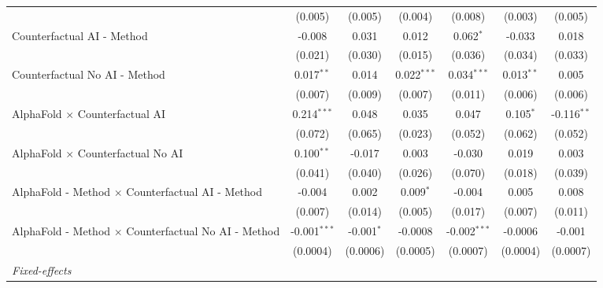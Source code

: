 \begin{tabular}{lcccccc}
                                                              & (0.005)        & (0.005)       & (0.004)       & (0.008)        & (0.003)       & (0.005)\\   
   Counterfactual AI - Method                                 & -0.008         & 0.031         & 0.012         & 0.062$^{*}$    & -0.033        & 0.018\\   
                                                              & (0.021)        & (0.030)       & (0.015)       & (0.036)        & (0.034)       & (0.033)\\   
   Counterfactual No AI - Method                              & 0.017$^{**}$   & 0.014         & 0.022$^{***}$ & 0.034$^{***}$  & 0.013$^{**}$  & 0.005\\   
                                                              & (0.007)        & (0.009)       & (0.007)       & (0.011)        & (0.006)       & (0.006)\\   
   AlphaFold $\times$ Counterfactual AI                       & 0.214$^{***}$  & 0.048         & 0.035         & 0.047          & 0.105$^{*}$   & -0.116$^{**}$\\   
                                                              & (0.072)        & (0.065)       & (0.023)       & (0.052)        & (0.062)       & (0.052)\\   
   AlphaFold $\times$ Counterfactual No AI                    & 0.100$^{**}$   & -0.017        & 0.003         & -0.030         & 0.019         & 0.003\\   
                                                              & (0.041)        & (0.040)       & (0.026)       & (0.070)        & (0.018)       & (0.039)\\   
   AlphaFold - Method $\times$ Counterfactual AI - Method     & -0.004         & 0.002         & 0.009$^{*}$   & -0.004         & 0.005         & 0.008\\   
                                                              & (0.007)        & (0.014)       & (0.005)       & (0.017)        & (0.007)       & (0.011)\\   
   AlphaFold - Method $\times$ Counterfactual No AI - Method  & -0.001$^{***}$ & -0.001$^{*}$  & -0.0008       & -0.002$^{***}$ & -0.0006       & -0.001\\   
                                                              & (0.0004)       & (0.0006)      & (0.0005)      & (0.0007)       & (0.0004)      & (0.0007)\\   
   \midrule
   \emph{Fixed-effects}\\

\end{tabular}
